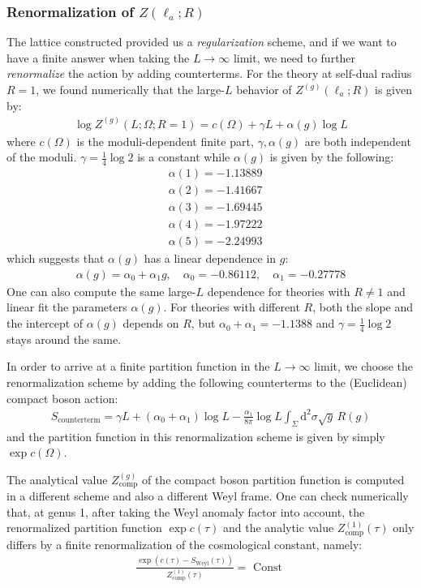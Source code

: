 \documentclass[12pt,letterpaper]{article}
\def\ie{\begin{equation}\begin{aligned}}
\def\fe{\end{aligned}\end{equation}}
\numberwithin{equation}{section}
\begin{document}
\subsubsection*{Renormalization of $Z(\ell_a;R)$}

The lattice constructed provided us a \textit{regularization} scheme, and if we want to have a finite answer when taking the $L\rightarrow \infty$ limit, we need to further \textit{renormalize} the action by adding counterterms. For the theory at self-dual radius $R=1$, we found numerically that the large-$L$ behavior of $Z^{(g)}(\ell_a;R)$ is given by:
\ie
\log Z^{(g)}(L;\Omega;R=1) = c(\Omega) + \gamma L + \alpha(g) \log L
\fe
where $c(\Omega)$ is the moduli-dependent finite part, $\gamma, \alpha(g)$ are both independent of the moduli. $\gamma = \frac{1}{4} \log 2$ is a constant while $\alpha(g)$ is given by the following:
\ie
&\alpha(1)= -1.13889\\
&\alpha(2)= -1.41667\\
&\alpha(3)= -1.69445\\
&\alpha(4)= -1.97222\\
&\alpha(5)= -2.24993
\fe
which suggests that $\alpha(g)$ has a linear dependence in $g$:
\ie
\alpha(g)=\alpha_0+\alpha_1 g,\quad \alpha_0=-0.86112,\quad \alpha_1= - 0.27778
\fe
One can also compute the same large-$L$ dependence for theories with $R\neq 1$ and linear fit the parameters $\alpha(g)$. For theories with different $R$, both the slope and the intercept of $\alpha(g)$ depends on $R$, but $\alpha_0+\alpha_1 = -1.1388$ and  $\gamma= \frac{1}{4} \log 2$ stays around the same.

In order to arrive at a finite partition function in the $L\rightarrow \infty$ limit, we choose the renormalization scheme by adding the following counterterms to the (Euclidean) compact boson action:
\ie
S_\text{counterterm} = \gamma L + (\alpha_0+\alpha_1)\log L- \frac{\alpha_1}{8\pi}\log L\int_\Sigma \mathrm{d}^2\sigma \sqrt{g}\, R(g)
\fe
and the partition function in this renormalization scheme is given by simply $\exp c(\Omega)$.

The analytical value $Z_\text{comp}^{(g)}$ of the compact boson partition function is computed in a different scheme and also a different Weyl frame. One can check numerically that, at genus 1, after taking the Weyl anomaly factor into account, the renormalized partition function $\exp c(\tau)$ and the analytic value $Z_\text{comp}^{(1)}(\tau)$ only differs by a finite renormalization of the cosmological constant, namely:
\ie
\frac{\exp(c(\tau)-S_\text{Weyl}(\tau))}{Z_\text{comp}^{(1)}(\tau)} = \text{ Const }
\fe
\end{document}
